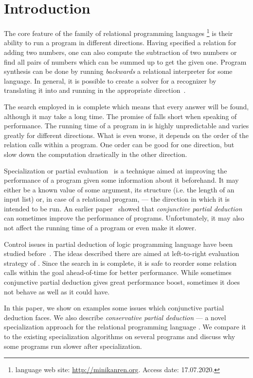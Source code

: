 \section{Introduction}

The core feature of the family of relational programming languages \mk{}\footnote{\mk{} language web site: \url{http://minikanren.org}. Access date: 17.07.2020.} is their ability to run a program in different directions.
Having specified a relation for adding two numbers, one can also compute the subtraction of two numbers or find all pairs of numbers which can be summed up to get the given one.
Program synthesis can be done by running \emph{backwards} a relational interpreter for some language.
In general, it is possible to create a solver for a recognizer by translating it into \mk{} and running in the appropriate direction~\cite{lozov2019relational}.

The search employed in \mk{} is complete which means that every answer will be found, although it may take a long time.
The promise of \mk{} falls short when speaking of performance.
The running time of a program in \mk{} is highly unpredictable and varies greatly for different directions.
What is even worse, it depends on the order of the relation calls within a program.
One order can be good for one direction, but slow down the computation drastically in the other direction.

Specialization or partial evaluation~\cite{jonesbook} is a technique aimed at improving the performance of a program given some information about it beforehand.
It may either be a known value of some argument, its structure (i.e. the length of an input list) or, in case of a relational program, --- the direction in which it is intended to be run.
An earlier paper~\cite{lozov2019relational} showed that \emph{conjunctive partial deduction}~\cite{de1999conjunctive} can sometimes improve the performance of \mk{} programs.
Unfortunately, it may also not affect the running time of a program or even make it slower.

Control issues in partial deduction of logic programming language \pro{} have been studied before~\cite{leuschel2002logic}.
The ideas described there are aimed at left-to-right evaluation strategy of \pro{}.
Since the search in \mk{} is complete, it is safe to reorder some relation calls within the goal ahead-of-time for better performance.
While sometimes conjunctive partial deduction gives great performance boost, sometimes it does not behave as well as it could have.

In this paper, we show on examples some issues which conjunctive partial deduction faces.
We also describe \emph{conservative partial deduction} --- a novel specialization approach for the relational programming language \mk{}.
We compare it to the existing specialization algorithms on several programs and discuss why some \mk{} programs run slower after specialization.
